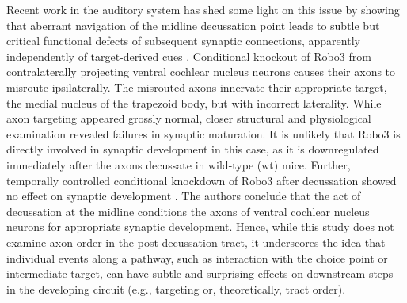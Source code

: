 Recent work in the auditory system has shed some light on this issue by showing that aberrant navigation of the midline decussation point leads to subtle but critical functional defects of subsequent synaptic connections, apparently independently of target-derived cues \cite{michalski2013robo3}. 
Conditional knockout of Robo3 from contralaterally projecting ventral cochlear nucleus neurons causes their axons to misroute ipsilaterally. 
The misrouted axons innervate their appropriate target, the medial nucleus of the trapezoid body, but with incorrect laterality. 
While axon targeting appeared grossly normal, closer structural and physiological examination revealed failures in synaptic maturation. 
It is unlikely that Robo3 is directly involved in synaptic development in this case, as it is downregulated immediately after the axons decussate in wild-type (wt) mice. 
Further, temporally controlled conditional knockdown of Robo3 after decussation showed no effect on synaptic development \cite{michalski2013robo3}. 
The authors conclude that the act of decussation at the midline conditions the axons of ventral cochlear nucleus neurons for appropriate synaptic development. 
Hence, while this study does not examine axon order in the post-decussation tract, it underscores the idea that individual events along a pathway, such as interaction with the choice point or intermediate target, can have subtle and surprising effects on downstream steps in the developing circuit (e.g., targeting or, theoretically, tract order). 


